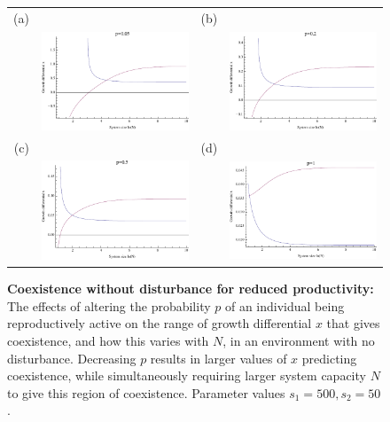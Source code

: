 \begin{figure}[th]
\centering
   \begin{tabular}{rrrr}
   (a)&&(b)&\\
  &\includegraphics[width=2.5in]{p005nondist.pdf} && \includegraphics[width=2.5in]{p020nondist.pdf} \\
  (c)&&(d)&\\
  &\includegraphics[width=2.5in]{p050nondist.pdf} && \includegraphics[width=2.5in]{p100nondist.pdf} \end{tabular}
   \caption[Coexistence without disturbance for reduced productivity]{\textbf{Coexistence without disturbance for reduced productivity:} The effects of altering the probability $p$ of an individual being reproductively active on the range of growth differential $x$ that gives coexistence, and how this varies with $N$, in an environment with no disturbance. Decreasing $p$ results in larger values of $x$ predicting coexistence, while simultaneously requiring larger system capacity $N$ to give this region of coexistence. Parameter values $s_1=500, s_2=50$.}
 \label{fig:pnondist}
\end{figure}


